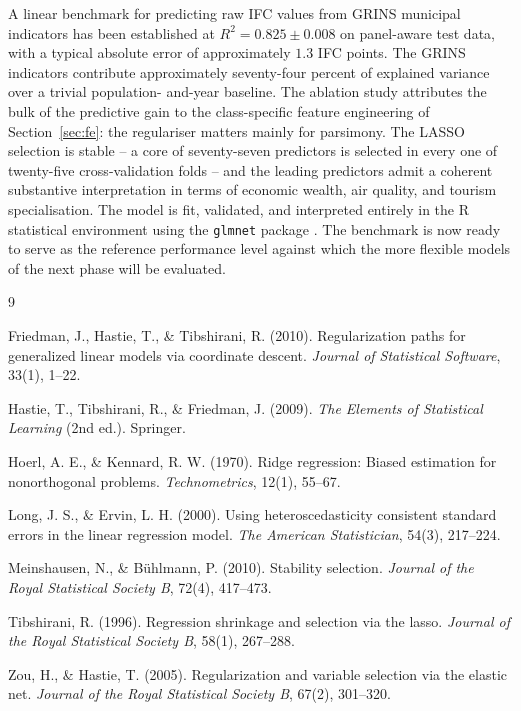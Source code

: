 \documentclass[11pt,a4paper]{article}
\begin{document}
A linear benchmark for predicting raw IFC values from GRINS municipal
indicators has been established at \(R^{2} = 0.825 \pm 0.008\) on
panel-aware test data, with a typical absolute error of approximately
\(1.3\) IFC points. The GRINS indicators contribute approximately
seventy-four percent of explained variance over a trivial population-
and-year baseline. The ablation study attributes the bulk of the
predictive gain to the class-specific feature engineering of
Section~\ref{sec:fe}: the regulariser matters mainly for parsimony.
The LASSO selection is stable -- a core of seventy-seven predictors is
selected in every one of twenty-five cross-validation folds -- and the
leading predictors admit a coherent substantive interpretation in
terms of economic wealth, air quality, and tourism specialisation. The
model is fit, validated, and interpreted entirely in the \textsf{R}
statistical environment using the \texttt{glmnet} package
\citep{friedman2010glmnet}. The benchmark is now ready to serve as
the reference performance level against which the more flexible
models of the next phase will be evaluated.

\begin{thebibliography}{9}

  Friedman, J., Hastie, T., \& Tibshirani, R. (2010).
  Regularization paths for generalized linear models via coordinate
  descent. \textit{Journal of Statistical Software}, 33(1), 1--22.

  Hastie, T., Tibshirani, R., \& Friedman, J. (2009).
  \textit{The Elements of Statistical Learning}
  (2nd ed.). Springer.

  Hoerl, A. E., \& Kennard, R. W. (1970).
  Ridge regression: Biased estimation for nonorthogonal problems.
  \textit{Technometrics}, 12(1), 55--67.

  Long, J. S., \& Ervin, L. H. (2000).
  Using heteroscedasticity consistent standard errors in the linear
  regression model. \textit{The American Statistician}, 54(3),
  217--224.

  Meinshausen, N., \& Bühlmann, P. (2010).
  Stability selection. \textit{Journal of the Royal Statistical
  Society B}, 72(4), 417--473.

  Tibshirani, R. (1996).
  Regression shrinkage and selection via the lasso. \textit{Journal
  of the Royal Statistical Society B}, 58(1), 267--288.

  Zou, H., \& Hastie, T. (2005).
  Regularization and variable selection via the elastic net.
  \textit{Journal of the Royal Statistical Society B}, 67(2),
  301--320.

\end{thebibliography}
\end{document}
